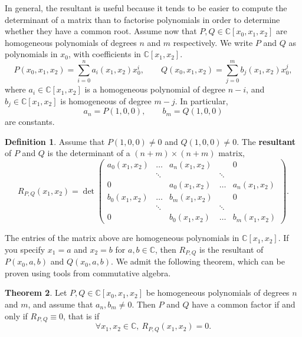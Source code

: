 \documentclass{article}
\newcommand{\C}{\mathbb{C}}
\newcommand{\rb}[1]{\left( #1 \right)}
\renewcommand{\sb}[1]{\left[ #1 \right]}
\theoremstyle{definition}\newtheorem{definition}{Definition}[section]
\theoremstyle{definition}\newtheorem{notation}[definition]{Notation}
\theoremstyle{definition}\newtheorem{remark}[definition]{Remark}
\theoremstyle{definition}\newtheorem{example1}[definition]{Example}
\theoremstyle{definition}\newtheorem{fact}{Fact}
\theoremstyle{definition}\newtheorem{exercise}{Exercise}
\theoremstyle{definition}\newtheorem*{example2}{Example}
\newtheorem{theorem}[definition]{Theorem}
\begin{document}

In general, the resultant is useful because it tends to be easier to compute the determinant of a matrix than to factorise polynomials in order to determine whether they have a common root. Assume now that $ P, Q \in \C\sb{x_0, x_1, x_2} $ are homogeneous polynomials of degrees $ n $ and $ m $ respectively. We write $ P $ and $ Q $ as polynomials in $ x_0 $, with coefficients in $ \C\sb{x_1, x_2} $.
$$ P\rb{x_0, x_1, x_2} = \sum_{i = 0}^n a_i\rb{x_1, x_2}x_0^i, \qquad Q\rb{x_0, x_1, x_2} = \sum_{j = 0}^m b_j\rb{x_1, x_2}x_0^j, $$
where $ a_i \in \C\sb{x_1, x_2} $ is a homogeneous polynomial of degree $ n - i $, and $ b_j \in \C\sb{x_1, x_2} $ is homogeneous of degree $ m - j $. In particular,
$$ a_n = P\rb{1, 0, 0}, \qquad b_m = Q\rb{1, 0, 0} $$
are constants.

\begin{definition}
\label{def:9.5}
Assume that $ P\rb{1, 0, 0} \ne 0 $ and $ Q\rb{1, 0, 0} \ne 0 $. The \textbf{resultant} of $ P $ and $ Q $ is the determinant of a $ \rb{n + m} \times \rb{n + m} $ matrix,
$$ R_{P, Q}\rb{x_1, x_2} = \det\begin{pmatrix}
a_0\rb{x_1, x_2} & \dots & a_n\rb{x_1, x_2} & & 0 \\
& \ddots & & \ddots & \\
0 & & a_0\rb{x_1, x_2} & \dots & a_n\rb{x_1, x_2} \\
b_0\rb{x_1, x_2} & \dots & b_m\rb{x_1, x_2} & & 0 \\
& \ddots & & \ddots & \\
0 & & b_0\rb{x_1, x_2} & \dots & b_m\rb{x_1, x_2}
\end{pmatrix}. $$
\end{definition}

The entries of the matrix above are homogeneous polynomials in $ \C\sb{x_1, x_2} $. If you specify $ x_1 = a $ and $ x_2 = b $ for $ a, b \in \C $, then $ R_{P, Q} $ is the resultant of $ P\rb{x_0, a, b} $ and $ Q\rb{x_0, a, b} $. We admit the following theorem, which can be proven using tools from commutative algebra.

\begin{theorem}
\label{thm:9.6}
Let $ P, Q \in \C\sb{x_0, x_1, x_2} $ be homogeneous polynomials of degrees $ n $ and $ m $, and assume that $ a_n, b_m \ne 0 $. Then $ P $ and $ Q $ have a common factor if and only if $ R_{P, Q} \equiv 0 $, that is if
$$ \forall x_1, x_2 \in \C, \ R_{P, Q}\rb{x_1, x_2} = 0. $$
\end{theorem}
\end{document}
